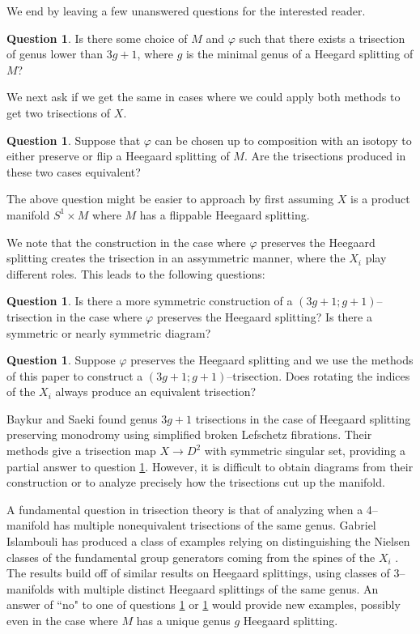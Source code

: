 \documentclass[12pt]{amsart}
\theoremstyle{definition}
\newtheorem{question}[thm]{Question}
\theoremstyle{remark}
\begin{document}
We end by leaving a few unanswered questions for the interested reader.  
\begin{question}
Is there some choice of $M$ and $\varphi$ such that there exists a trisection of genus lower than $3g+1$, where $g$ is the minimal genus of a Heegard splitting of $M$?
\end{question}

We next ask if we get the same in cases where we could apply both methods to get two trisections of $X$.

\begin{question}
Suppose that $\varphi$ can be chosen up to composition with an isotopy to either preserve or flip a Heegaard splitting of $M$.   Are the trisections produced in these two cases equivalent?
\label{unequal1}
\end{question}

The above question might be easier to approach by first assuming $X$ is a product manifold $S^1 \times M$ where $M$ has a flippable Heegaard splitting.  

We note that the construction in the case where $\varphi$ preserves the Heegaard splitting creates the trisection in an assymmetric manner, where the $X_i$ play different roles.  This leads to the following questions:
\begin{question}
\label{q_assym}
Is there a more symmetric construction of a $(3g+1;g+1)$--trisection in the case where $\varphi$ preserves the Heegaard splitting?  Is there a symmetric or nearly symmetric diagram?
\end{question}

\begin{question}
Suppose $\varphi$ preserves the Heegaard splitting and we use the methods of this paper to construct a $(3g+1;g+1)$--trisection.  Does rotating the indices of the $X_i$ always produce an equivalent trisection?
\label{unequal3}
\end{question}

Baykur and Saeki found genus $3g+1$ trisections in the case of Heegaard splitting preserving monodromy using simplified broken Lefschetz fibrations.  Their methods give a trisection map $X \to D^2$ with symmetric singular set, providing a partial answer to question \ref{q_assym}.  However, it is difficult to obtain diagrams from their construction or to analyze precisely how the trisections cut up the manifold.


A fundamental question in trisection theory is that of analyzing when a 4--manifold has multiple nonequivalent trisections of the same genus.  Gabriel Islambouli has produced a class of examples relying on distinguishing the Nielsen classes of the fundamental group generators coming from the spines of the $X_i$ \cite{Islambouli1}.  The results build off of similar results on Heegaard splittings, using classes of 3--manifolds with multiple distinct Heegaard splittings of the same genus.  An answer of ``no" to one of questions \ref{unequal1} or \ref{unequal3} would provide new examples, possibly even in the case where $M$ has a unique genus $g$ Heegaard splitting.  
\end{document}
